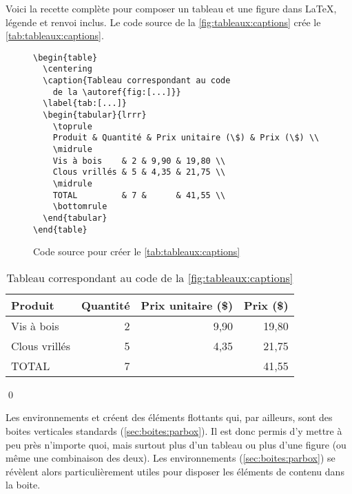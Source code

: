 \begin{exemple}
  Voici la recette complète pour composer un tableau et une figure
  dans {\LaTeX}, légende et renvoi inclus. Le code source de la
  \autoref{fig:tableaux:captions} crée le
  \autoref{tab:tableaux:captions}.
  \begin{figure}
\begin{lstlisting}
\begin{table}
  \centering
  \caption{Tableau correspondant au code
    de la \autoref{fig:[...]}}
  \label{tab:[...]}
  \begin{tabular}{lrrr}
    \toprule
    Produit & Quantité & Prix unitaire (\$) & Prix (\$) \\
    \midrule
    Vis à bois    & 2 & 9,90 & 19,80 \\
    Clous vrillés & 5 & 4,35 & 21,75 \\
    \midrule
    TOTAL         & 7 &      & 41,55 \\
    \bottomrule
  \end{tabular}
\end{table}
\end{lstlisting}
    \caption{Code source pour créer le \autoref{tab:tableaux:captions}}
    \label{fig:tableaux:captions}
  \end{figure}
  \begin{table}
    \centering
    \caption{Tableau correspondant au code de la \autoref{fig:tableaux:captions}}
    \label{tab:tableaux:captions}
    \begin{tabular}{lrrr}
      \toprule
      Produit & Quantité & Prix unitaire (\$) & Prix (\$) \\
      \midrule
      Vis à bois    & 2 & 9,90 & 19,80 \\
      Clous vrillés & 5 & 4,35 & 21,75 \\
      \midrule
      TOTAL         & 7 &      & 41,55 \\
      \bottomrule
    \end{tabular}
  \end{table}
  \qed
\end{exemple}

Les environnements  et  créent des éléments
flottants qui, par ailleurs, sont des boites verticales standards
(\autoref{sec:boites:parbox}). Il est donc permis d'y mettre à peu
près n'importe quoi, mais surtout plus d'un tableau ou plus d'une
figure (ou même une combinaison des deux). Les environnements
 (\autoref{sec:boites:parbox}) se révèlent alors
particulièrement utiles pour disposer les éléments de contenu dans la
boite.

